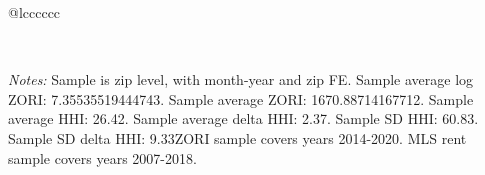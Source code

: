 \begin{table}[H]
{\begin{tabular}{@{\extracolsep{5pt}}lcccccc}
 \hline  

 \hline \\[-1.8ex]  

  {\parbox[t]{\textwidth}{ \textit{Notes:} Sample is zip level, with month-year and zip FE. Sample average log ZORI: 7.35535519444743. Sample average ZORI: 1670.88714167712. Sample average HHI: 26.42. Sample average delta HHI: 2.37. Sample SD HHI: 60.83. Sample SD delta HHI: 9.33ZORI sample covers years 2014-2020. MLS rent sample covers years 2007-2018.}} \\ 

 \end{tabular}}  

 \end{table}  

